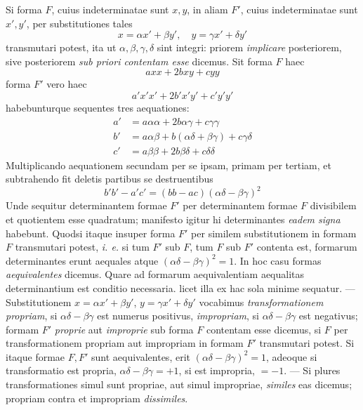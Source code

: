 Si forma $F$, cuius indeterminatae sunt $x,y$, in aliam $F'$, cuius indeterminatae sunt $x',y'$, per substitutiones tales
\[
x=\alpha x'+\beta y',\quad y=\gamma x'+\delta y'
\]
transmutari potest, ita ut $\alpha,\beta,\gamma,\delta$ sint integri: priorem \textit{implicare} posteriorem, sive posteriorem \textit{sub priori contentam esse} dicemus. Sit forma $F$ haec
\[
axx+2bxy+cyy
\]
forma $F'$ vero haec
\[
a'x'x'+2b'x'y'+c'y'y'
\]
habebunturque sequentes tres aequationes:
\[
\begin{aligned}
a'&=a\alpha\alpha+2b\alpha\gamma+c\gamma\gamma\\
b'&=a\alpha\beta+b(\alpha\delta+\beta\gamma)+c\gamma\delta\\
c'&=a\beta\beta+2b\beta\delta+c\delta\delta
\end{aligned}
\]
Multiplicando aequationem secundam per se ipsam, primam per tertiam, et subtrahendo fit deletis partibus se destruentibus
\[
b'b'-a'c'=(bb-ac)(\alpha\delta-\beta\gamma)^2
\]
Unde sequitur determinantem formae $F'$ per determinantem formae $F$ divisibilem et quotientem esse quadratum; manifesto igitur hi determinantes \textit{eadem signa} habebunt. Quodsi itaque insuper forma $F'$ per similem substitutionem in formam $F$ transmutari potest, \textit{i. e.} si tum $F'$ sub $F$, tum $F$ sub $F'$ contenta est,
formarum determinantes erunt aequales atque $(\alpha\delta-\beta\gamma)^2=1$. In hoc casu formas \textit{aequivalentes} dicemus. Quare ad formarum aequivalentiam aequalitas determinantium est conditio necessaria. licet illa ex hac sola minime sequatur. --- Substitutionem $x=\alpha x'+\beta y'$, $y=\gamma x'+\delta y'$ vocabimus \textit{transformationem propriam}, si $\alpha\delta-\beta\gamma$ est numerus positivus, \textit{impropriam}, si $\alpha\delta-\beta\gamma$ est negativus; formam $F'$ \textit{proprie} aut \textit{improprie} sub forma $F$ contentam esse dicemus, si $F$ per transformationem propriam aut impropriam in formam $F'$ transmutari potest. Si itaque formae $F,F'$ sunt aequivalentes, erit $(\alpha\delta-\beta\gamma)^2=1$, adeoque si transformatio est propria, $\alpha\delta-\beta\gamma=+1$, si est impropria, $=-1$. --- Si plures transformationes simul sunt propriae, aut simul impropriae, \textit{similes} eas dicemus; propriam contra et impropriam \textit{dissimiles}.


